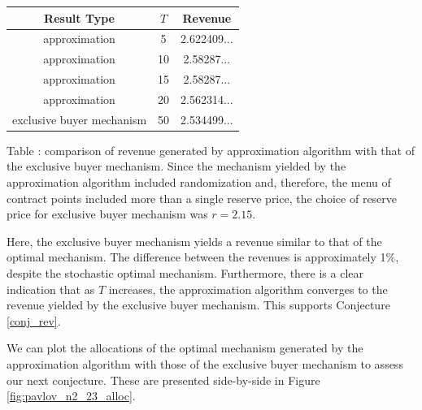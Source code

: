 \documentclass{article}
\newcounter{fig}
\begin{document}
\begin{center}
    \begin{tabular}{ |c|c|c| } 
    \hline
    Result Type & $T$ & Revenue \\
    \hline
    \hline
    approximation & 5 & 2.622409... \\ 
    approximation & 10 & 2.58287... \\ 
    approximation & 15 & 2.58287... \\ 
    approximation & 20 & 2.562314... \\ 
    exclusive buyer mechanism & 50 & 2.534499... \\
    \hline
    \end{tabular}

    \vspace{1mm}
    \raggedright{\small {\sc Table \thefig\label{table:pavlov_23_n2_revenue}:} comparison of revenue generated by approximation algorithm with that of the exclusive buyer mechanism. Since the mechanism yielded by the approximation algorithm included randomization and, therefore, the menu of contract points included more than a single reserve price, the choice of reserve price for exclusive buyer mechanism was $r=2.15$.}
\end{center}

\noindent Here, the exclusive buyer mechanism yields a revenue similar to that of the optimal mechanism. The difference between the revenues is approximately 1\%, despite the stochastic optimal mechanism. Furthermore, there is a clear indication that as $T$ increases, the approximation algorithm converges to the revenue yielded by the exclusive buyer mechanism. This supports Conjecture \ref{conj_rev}.

We can plot the allocations of the optimal mechanism generated by the approximation algorithm with those of the exclusive buyer mechanism to assess our next conjecture. These are presented side-by-side in Figure \ref{fig:pavlov_n2_23_alloc}.
\end{document}
